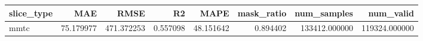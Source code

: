 \begin{tabular}{lrrrrrrr}
\toprule
slice_type & MAE & RMSE & R2 & MAPE & mask_ratio & num_samples & num_valid \\
\midrule
mmtc & 75.179977 & 471.372253 & 0.557098 & 48.151642 & 0.894402 & 133412.000000 & 119324.000000 \\
\bottomrule
\end{tabular}
